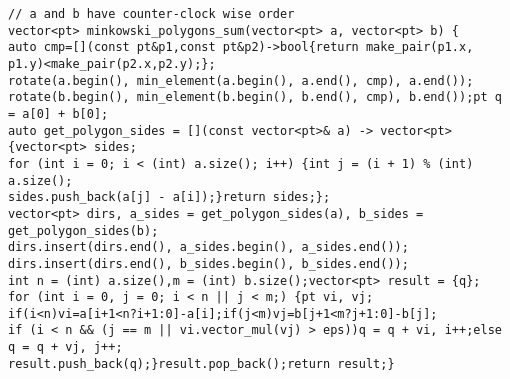 \documentclass[a4paper,12pt]{article}
\begin{document}
\begin{verbatim}
// a and b have counter-clock wise order
vector<pt> minkowski_polygons_sum(vector<pt> a, vector<pt> b) {
auto cmp=[](const pt&p1,const pt&p2)->bool{return make_pair(p1.x, p1.y)<make_pair(p2.x,p2.y);};
rotate(a.begin(), min_element(a.begin(), a.end(), cmp), a.end());
rotate(b.begin(), min_element(b.begin(), b.end(), cmp), b.end());pt q = a[0] + b[0];
auto get_polygon_sides = [](const vector<pt>& a) -> vector<pt> {vector<pt> sides;
for (int i = 0; i < (int) a.size(); i++) {int j = (i + 1) % (int) a.size();
sides.push_back(a[j] - a[i]);}return sides;};
vector<pt> dirs, a_sides = get_polygon_sides(a), b_sides = get_polygon_sides(b);
dirs.insert(dirs.end(), a_sides.begin(), a_sides.end());
dirs.insert(dirs.end(), b_sides.begin(), b_sides.end());
int n = (int) a.size(),m = (int) b.size();vector<pt> result = {q};
for (int i = 0, j = 0; i < n || j < m;) {pt vi, vj;
if(i<n)vi=a[i+1<n?i+1:0]-a[i];if(j<m)vj=b[j+1<m?j+1:0]-b[j];
if (i < n && (j == m || vi.vector_mul(vj) > eps))q = q + vi, i++;else q = q + vj, j++;
result.push_back(q);}result.pop_back();return result;}
\end{verbatim}
\end{document}
